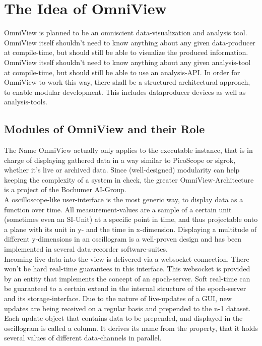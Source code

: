\documentclass[]{scrreprt}
\begin{document}
\chapter{The Idea of OmniView}
OmniView is planned to be an omniscient data-visualization and analysis tool. 
OmniView itself shouldn't need to know anything about any given data-producer at compile-time, but should still be able to visualize the produced information.
OmniView itself shouldn't need to know anything about any given analysis-tool at compile-time, but should still be able to use an analysis-API. 
In order for OmniView to work this way, there shall be a structured architectural approach, to enable modular development.
This includes dataproducer devices as well as analysis-tools.

\section[Modules]{Modules of OmniView and their Role}
The Name OmniView actually only applies to the executable instance, that is in charge of displaying gathered data in a way similar to PicoScope or sigrok, whether it's live or archived data. 
Since (well-designed) modularity can help keeping the complexity of a system in check, the greater OmniView-Architecture is a project of the Bochumer AI-Group.
\\
A oscilloscope-like user-interface is the most generic way, to display data as a function over time. 
All measurement-values are a sample of a certain unit (sometimes even an SI-Unit) at a specific point in time, and thus projectable onto a plane with its unit in y- and the time in x-dimension. 
Displaying a multitude of different y-dimensions in an oscillogram is a well-proven design and has been implemented in several data-recorder software-suites. 
\\
Incoming live-data into the view is delivered via a websocket connection.
There won't be hard real-time guarantees in this interface. 
This websocket is provided by an entity that implements the concept of an epoch-server.
Soft real-time can be guaranteed to a certain extend in the internal structure of the epoch-server and its storage-interface.
Due to the nature of live-updates of a GUI, new updates are being received on a regular basis and prepended to the n-1 dataset.
Each update-object that contains data to be prepended, and displayed in the oscillogram is called a column. 
It derives its name from the property, that it holds several values of different data-channels in parallel.
\end{document}
